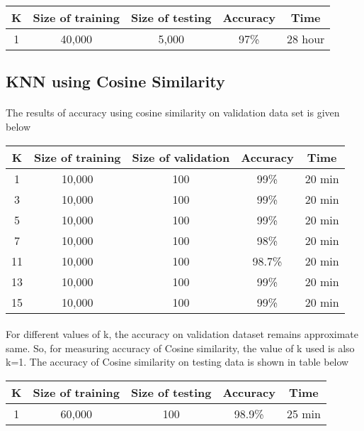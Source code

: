 \documentclass[]{report}
\begin{document}
\begin{center}
	\begin{tabular}{||c c c c c||} 
		\hline
		K & Size of training & Size of testing & Accuracy& Time \\ [0.5ex] 
		\hline\hline
		1 & 40,000 & 5,000 & 97\% & 28 hour \\ 
		 [1ex] 
		\hline
	\end{tabular}
\end{center}
\subsection{KNN using Cosine Similarity}
\paragraph{}The results of accuracy using cosine similarity on validation data set is given below
\begin{center}
	\begin{tabular}{||c c c c c||} 
		\hline
		K & Size of training & Size of validation & Accuracy& Time \\ [0.5ex] 
		\hline\hline
		1 & 10,000 & 100 & 99\% & 20 min\\ 
		\hline
		3 & 10,000 & 100&99\% & 20 min \\ 
		\hline
		5 & 10,000 & 100 & 99\% &20 min \\
		\hline
		7 & 10,000 & 100 & 98\% & 20 min \\
		\hline
		11 & 10,000 & 100 & 98.7\% & 20 min \\
		\hline
		13 & 10,000 & 100 & 99\% & 20 min \\
		\hline
		15 & 10,000 & 100 & 99\% & 20 min \\ [1ex] 
		\hline
	\end{tabular}
\end{center}
\paragraph{} For different values of k, the accuracy on validation dataset remains approximate same. So, for measuring accuracy of Cosine similarity, the value of k used is also k=1. The accuracy of Cosine similarity on testing data is shown in table below
\begin{center}
	\begin{tabular}{||c c c c c||} 
		\hline
		K & Size of training & Size of testing & Accuracy& Time \\ [0.5ex] 
		\hline\hline
		1 & 60,000 & 100 & 98.9\% & 25 min \\ 
		[1ex] 
		\hline
	\end{tabular}
\end{center}
\end{document}
